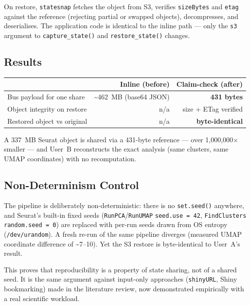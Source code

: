 \documentclass[11pt,a4paper]{article}
\begin{document}
On restore, \texttt{statesnap} fetches the object from S3, verifies
\texttt{sizeBytes} and \texttt{etag} against the reference (rejecting partial or
swapped objects), decompresses, and deserialises. The application code is
identical to the inline path --- only the \texttt{s3} argument to
\texttt{capture\_state()} and \texttt{restore\_state()} changes.

\subsection{Results}

\begin{center}
\begin{tabular}{lrr}
                          & \textbf{Inline (before)} & \textbf{Claim-check (after)} \\
\hline
Bus payload for one share & \textasciitilde 462~MB (base64 JSON) & \textbf{431 bytes} \\
Object integrity on restore & n/a & size + ETag verified \\
Restored object vs original & n/a & \textbf{byte-identical} \\
\end{tabular}
\end{center}

A 337~MB Seurat object is shared via a 431-byte reference --- over
1,000,000$\times$ smaller --- and User~B reconstructs the exact analysis (same
clusters, same UMAP coordinates) with no recomputation.

\subsection{Non-Determinism Control}

The pipeline is deliberately non-deterministic: there is no \texttt{set.seed()}
anywhere, and Seurat's built-in fixed seeds (\texttt{RunPCA}/\texttt{RunUMAP}
\texttt{seed.use = 42}, \texttt{FindClusters} \texttt{random.seed = 0}) are
replaced with per-run seeds drawn from OS entropy (\texttt{/dev/urandom}). A
fresh re-run of the same pipeline diverges (measured UMAP coordinate difference
of \textasciitilde 7--10). Yet the S3 restore is byte-identical to User~A's
result.

This proves that reproducibility is a property of state sharing, not of a shared
seed. It is the same argument against input-only approaches (\texttt{shinyURL},
Shiny bookmarking) made in the literature review, now demonstrated empirically
with a real scientific workload.
\end{document}
